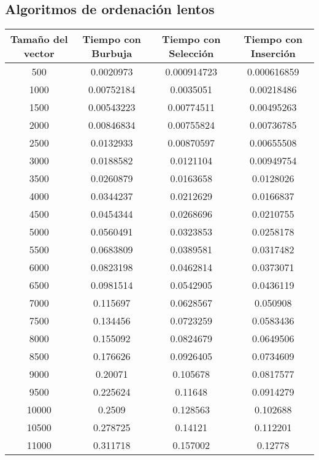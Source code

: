 \documentclass{article}
\begin{document}
	\subsection{Algoritmos de ordenación lentos}
		\begin{longtable}{|c|c|c|c|}
			\hline
			Tamaño del vector & Tiempo con Burbuja & Tiempo con Selección & Tiempo con Inserción \\ \hline
			500	   &  0.0020973	 &  0.000914723	 &  0.000616859  \\ \hline
			1000   &  0.00752184 &	0.0035051	 &  0.00218486  \\ \hline
			1500   &  0.00543223 &	0.00774511	 &  0.00495263  \\ \hline
			2000   &  0.00846834 &	0.00755824	 &  0.00736785  \\ \hline
			2500   &  0.0132933	 &  0.00870597	 &  0.00655508  \\ \hline
			3000   &  0.0188582	 &  0.0121104	 &  0.00949754  \\ \hline
			3500   &  0.0260879	 &  0.0163658	 &  0.0128026  \\ \hline
			4000   &  0.0344237	 &  0.0212629	 &  0.0166837  \\ \hline
			4500   &  0.0454344	 &  0.0268696	 &  0.0210755  \\ \hline
			5000   &  0.0560491	 &  0.0323853	 &  0.0258178  \\ \hline
			5500   &  0.0683809	 &  0.0389581	 &  0.0317482  \\ \hline
			6000   &  0.0823198	 &  0.0462814	 &  0.0373071  \\ \hline
			6500   &  0.0981514	 &  0.0542905	 &  0.0436119  \\ \hline
			7000   &  0.115697	 &  0.0628567	 &  0.050908  \\ \hline
			7500   &  0.134456	 &  0.0723259	 &  0.0583436  \\ \hline
			8000   &  0.155092	 &  0.0824679	 &  0.0649506  \\ \hline
			8500   &  0.176626	 &  0.0926405	 &  0.0734609  \\ \hline
			9000   &  0.20071	 &  0.105678	 &  0.0817577  \\ \hline
			9500   &  0.225624	 &  0.11648	     &  0.0914279  \\ \hline
			10000  &  0.2509	 &  0.128563	 &  0.102688  \\ \hline
			10500  &  0.278725	 &  0.14121	     &  0.112201  \\ \hline
			11000  &  0.311718	 &  0.157002	 &  0.12778  \\ \hline

\end{longtable}
\end{document}
